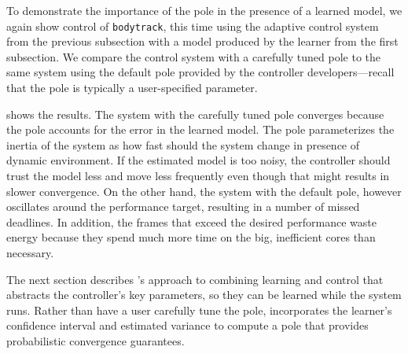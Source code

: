 To demonstrate the importance of the pole in the presence of a learned
model, we again show control of \texttt{bodytrack}, this time using
the adaptive control system from the previous subsection with a model
produced by the learner from the first subsection.  We compare the
control system with a carefully tuned pole to the same system using
the default pole provided by the controller developers---recall that
the pole is typically a user-specified parameter.  

 shows the results.  The system with the
carefully tuned pole converges because the pole accounts for the error
in the learned model. The pole parameterizes the inertia of the system as how fast should the system change in presence of dynamic environment. If the estimated model is too noisy, the controller should trust the model less and move less frequently even though that might results in slower convergence. On the other hand, the system with the default pole, however
oscillates around the performance target, resulting in a number of
missed deadlines.  In addition, the frames that exceed the desired
performance waste energy because they spend much more time on the big,
inefficient cores than necessary.

The next section describes \SYSTEM{}'s approach to combining learning
and control that abstracts the controller's key parameters, so they
can be learned while the system runs.  Rather than have a user
carefully tune the pole, \SYSTEM{} incorporates the learner's
confidence interval and estimated variance to compute a pole that
provides probabilistic convergence guarantees.  


